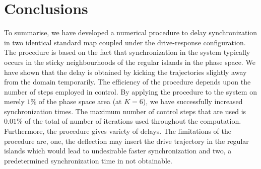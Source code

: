 \documentclass[preprint,showpacs,preprintnumbers,amsmath,amssymb]{revtex4-1}
\begin{document}
\section{Conclusions}
\label{sec:conclusions}
To summarise, we have developed a numerical procedure to delay synchronization in two identical standard map coupled under the drive-response configuration. The procedure is based on the fact that synchronization in the system typically occurs in the sticky neighbourhoods of the regular islands in the phase space. We have shown that the delay is obtained by kicking the trajectories slightly away from the domain temporarily. The efficiency of the procedure depends upon the number of steps employed in control. By applying the procedure to the system on merely $1\%$ of the phase space area (at $K = 6$), we have successfully increased synchronization times. The maximum number of control steps that are used is $0.01\%$ of the total of number of iterations used throughout the computation.  Furthermore, the procedure gives variety of delays. The limitations of the procedure are, one, the deflection may insert the drive trajectory in the regular islands which would lead to undesirable faster synchronization and two, a predetermined synchronization time in not obtainable. 


 

\end{document}
